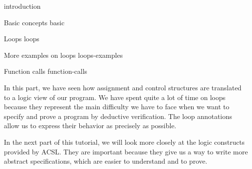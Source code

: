 \begin{levelTwo}
  {}
  {introduction}
\end{levelTwo}

\begin{levelTwo}
  {Basic concepts}
  {basic}
\end{levelTwo}

\begin{levelTwo}
  {Loops}
  {loops}
\end{levelTwo}

\begin{levelTwo}
  {More examples on loops}
  {loops-examples}
\end{levelTwo}

\begin{levelTwo}
  {Function calls}
  {function-calls}
\end{levelTwo}

\horizontalLine
\newpage


In this part, we have seen how assignment and control structures are translated
to a logic view of our program. We have spent quite a lot of time on loops
because they represent the main difficulty we have to face when we want to
specify and prove a program by deductive verification. The loop annotations
allow us to express their behavior as precisely as possible.



In the next part of this tutorial, we will look more closely at the logic
constructs provided by ACSL. They are important because they give us a way to
write more abstract specifications, which are easier to understand and to prove.
